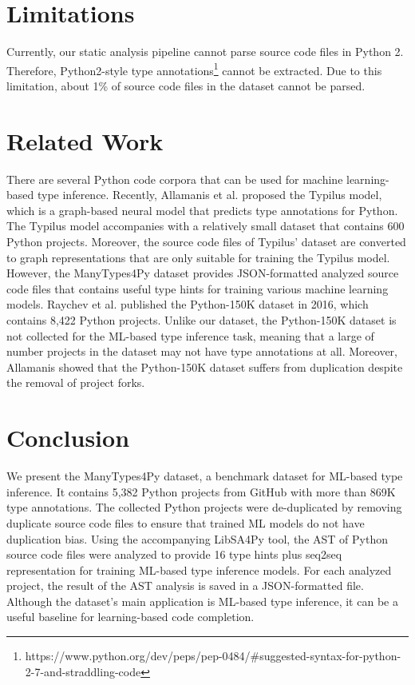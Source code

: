 \documentclass[10pt, conference]{IEEEtran}
\begin{document}
\section{Limitations}
Currently, our static analysis pipeline cannot parse source code files in Python 2. Therefore, Python2-style type annotations\footnote{https://www.python.org/dev/peps/pep-0484/\#suggested-syntax-for-python-2-7-and-straddling-code} cannot be extracted. Due to this limitation, about 1\% of source code files in the dataset cannot be parsed.

\section{Related Work}
There are several Python code corpora that can be used for machine learning-based type inference. Recently, Allamanis et al. \cite{allamanis2020typilus} proposed the Typilus model, which is a graph-based neural model that predicts type annotations for Python. The Typilus model \cite{allamanis2020typilus} accompanies with a relatively small dataset that contains 600 Python projects. Moreover, the source code files of Typilus' dataset are converted to graph representations that are only suitable for training the Typilus model. However, the ManyTypes4Py dataset provides JSON-formatted analyzed source code files that contains useful type hints for training various machine learning models. Raychev et al. \cite{raychev2016probabilistic} published the Python-150K dataset in 2016, which contains 8,422 Python projects. Unlike our dataset, the Python-150K dataset \cite{raychev2016probabilistic} is not collected for the ML-based type inference task, meaning that a large of number projects in the dataset may not have type annotations at all. Moreover, Allamanis \cite{allamanis2019adverse} showed that the Python-150K dataset suffers from duplication despite the removal of project forks.


\section{Conclusion}
We present the ManyTypes4Py dataset, a benchmark dataset for ML-based type inference. It contains 5,382 Python projects from GitHub with more than 869K type annotations. The collected Python projects were de-duplicated by removing duplicate source code files to ensure that trained ML models do not have duplication bias. Using the accompanying LibSA4Py tool, the AST of Python source code files were analyzed to provide 16 type hints plus seq2seq representation for training ML-based type inference models. For each analyzed project, the result of the AST analysis is saved in a JSON-formatted file. Although the dataset's main application is ML-based type inference, it can be a useful baseline for learning-based code completion.
\end{document}
